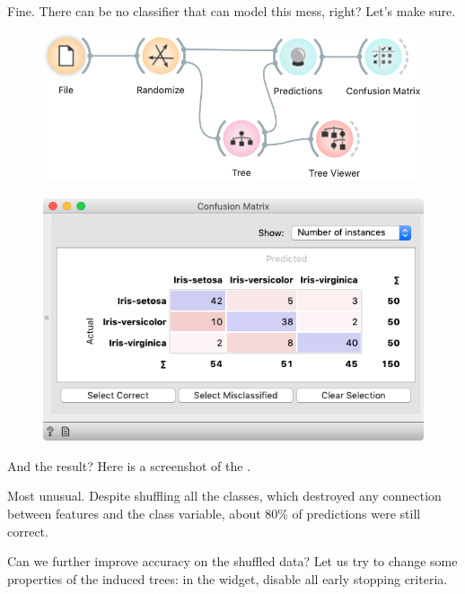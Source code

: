 Fine. There can be no classifier that can model this mess, right? Let’s make sure.

\begin{figure}[h]
    \includegraphics[scale=0.4]{graphics/ch-how_to_cheat/workflow_classification.png}
\end{figure}

\begin{figure}
    \includegraphics[scale=0.35]{graphics/ch-how_to_cheat/confusion_randomized.png}
\end{figure}

And the result? Here is a screenshot of the .

Most unusual. Despite shuffling all the classes, which destroyed any connection between features and the class variable, about 80\% of predictions were still correct.

\clearpage

Can we further improve accuracy on the shuffled data? Let us try to change some properties of the induced trees: in the  widget, disable all early stopping criteria.


